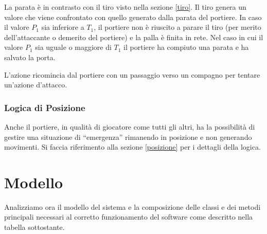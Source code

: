 \documentclass[aps,letterpaper,10pt]{article}
\begin{document}
La parata \`e in contrasto con il tiro visto nella sezione \ref{tiro}. Il tiro genera un valore che viene confrontato
con quello generato dalla parata del portiere. In caso il valore $P_1$ sia inferiore a $T_1$, il portiere non \`e
riuscito a parare il tiro (per merito dell'attaccante o demerito del portiere) e la palla \`e finita in rete. Nel caso
in cui il valore $P_1$ sia uguale o maggiore di $T_1$ il portiere ha compiuto una parata e ha salvato la porta.
\vspace{3mm}

L'azione ricomincia dal portiere con un passaggio verso un compagno per tentare un'azione d'attacco.

\subsubsection{Logica di Posizione}

Anche il portiere, in qualit\`a di giocatore come tutti gli altri, ha la possibilit\`a di gestire una situazione di
``emergenza'' rimanendo in posizione e non generando movimenti. Si faccia riferimento alla sezione \ref{posizione} per i
dettagli della logica.

\newpage

\section{Modello}

Analizziamo ora il modello del sistema e la composizione delle classi e dei metodi principali necessari al corretto
funzionamento del software come descritto nella tabella sottostante. \vspace{3mm}
\end{document}
